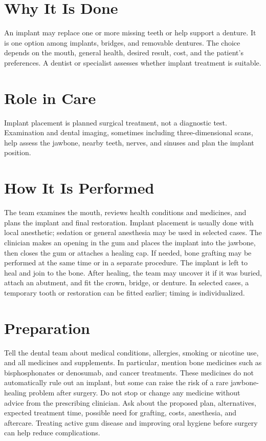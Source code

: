 \section*{Why It Is Done}
An implant may replace one or more missing teeth or help support a denture. It is one option among implants, bridges, and removable dentures. The choice depends on the mouth, general health, desired result, cost, and the patient's preferences. A dentist or specialist assesses whether implant treatment is suitable.

\section*{Role in Care}
Implant placement is planned surgical treatment, not a diagnostic test. Examination and dental imaging, sometimes including three-dimensional scans, help assess the jawbone, nearby teeth, nerves, and sinuses and plan the implant position.

\section*{How It Is Performed}
The team examines the mouth, reviews health conditions and medicines, and plans the implant and final restoration. Implant placement is usually done with local anesthetic; sedation or general anesthesia may be used in selected cases. The clinician makes an opening in the gum and places the implant into the jawbone, then closes the gum or attaches a healing cap. If needed, bone grafting may be performed at the same time or in a separate procedure. The implant is left to heal and join to the bone. After healing, the team may uncover it if it was buried, attach an abutment, and fit the crown, bridge, or denture. In selected cases, a temporary tooth or restoration can be fitted earlier; timing is individualized.

\section*{Preparation}
Tell the dental team about medical conditions, allergies, smoking or nicotine use, and all medicines and supplements. In particular, mention bone medicines such as bisphosphonates or denosumab, and cancer treatments. These medicines do not automatically rule out an implant, but some can raise the risk of a rare jawbone-healing problem after surgery. Do not stop or change any medicine without advice from the prescribing clinician. Ask about the proposed plan, alternatives, expected treatment time, possible need for grafting, costs, anesthesia, and aftercare. Treating active gum disease and improving oral hygiene before surgery can help reduce complications.

